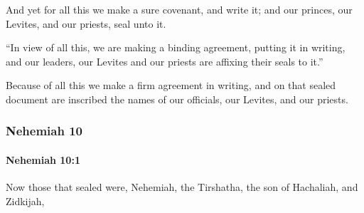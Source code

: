 			\begin{versebox}
					\item[BHS] 
					\item[LXX] 
					\item[ASV] And yet for all this we make a sure covenant, and write it; and our princes, our Levites, and our priests, seal unto it.
					\item[NIV] “In view of all this, we are making a binding agreement, putting it in writing, and our leaders, our Levites and our priests are affixing their seals to it.”
					\item[NRSV] Because of all this we make a firm agreement in writing, and on that sealed document are inscribed the names of our officials, our Levites, and our priests.
			\end{versebox}
	\subsubsection{Nehemiah 10} %
		\label{NEHEMIAH-10}

		\paragraph{Nehemiah 10:1} %
			\label{NEHEMIAH-10-1}

			Now those that sealed were, Nehemiah, the Tirshatha, the son of Hachaliah, and Zidkijah,

